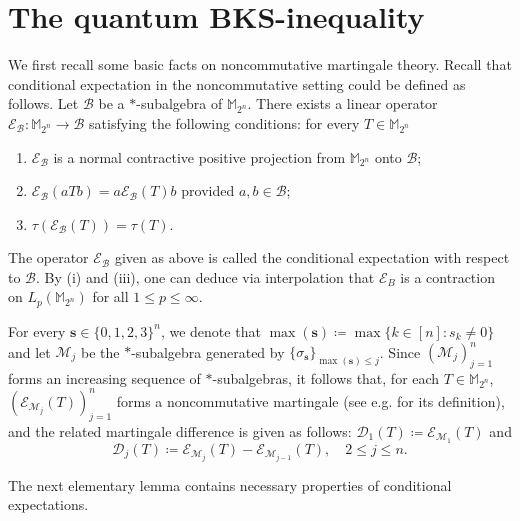 \documentclass{amsbook}
\theoremstyle{definition}
\theoremstyle{remark}
\numberwithin{section}{chapter}
\numberwithin{equation}{chapter}
\newcommand{\M}{\mathbb{M}}
\newcommand{\1}{\mathbf{1}}
\begin{document}
\section{The quantum BKS-inequality}\label{sec BKS 1}
We first recall some basic facts on noncommutative martingale theory. Recall that conditional expectation in the noncommutative setting could be defined as follows. Let $\mathcal{B}$ be a $\ast$-subalgebra of $\M_{2^{n}}$. There exists a linear operator $\mathcal{E}_{\mathcal{B}}: \M_{2^{n}}\to \mathcal{B}$ satisfying the following conditions: for every $T\in \M_{2^{n}}$
\begin{enumerate}[{\rm (i)}]
	\item $\mathcal{E}_{\mathcal{B}}$ is a normal contractive positive projection from $\M_{2^{n}}$ onto $\mathcal{B}$;
	\item $\mathcal{E}_{\mathcal{B}}(aTb)=a\mathcal{E}_{\mathcal{B}}(T)b$ provided $a,b\in\mathcal{B}$;
	\item $\tau(\mathcal{E}_{\mathcal{B}}(T))=\tau(T)$.
\end{enumerate}
The operator $\mathcal{E}_{\mathcal{B}}$ given as above is called the conditional expectation with respect to $\mathcal{B}$.  By (i) and (iii), one can deduce via interpolation that $\mathcal{E}_{B}$ is a contraction on $L_{p}(\M_{2^{n}})$ for all $1\leq p\leq\infty$.

For every $\mathbf{s}\in\{0,1,2,3\}^{n}$, we denote that $\max(\mathbf{s})\coloneqq\max\{k\in[n]:s_{k}\neq 0\}$ and let $\mathcal{M}_{j}$ be the $\ast$-subalgebra generated by $\{\sigma_{\mathbf{s}}\}_{\max(\mathbf{s})\leq j}$. Since $(\mathcal{M}_{j})_{j=1}^n$ forms an increasing sequence of $*$-subalgebras, it follows that, for each $T\in \M_{2^{n}}$, $(\mathcal{E}_{\mathcal{M}_{j}}(T))_{j=1}^{n}$ forms a noncommutative martingale (see e.g. \cite{PX1997} for its definition), and the related martingale difference is given as follows: $\mathcal{D}_{1}(T)\coloneqq\mathcal{E}_{\mathcal{M}_{1}}(T)$ and
\[
\mathcal{D}_{j}(T)\coloneqq\mathcal{E}_{\mathcal{M}_{j}}(T)-\mathcal{E}_{\mathcal{M}_{j-1}}(T),\quad 2\leq j\leq n.
\]


The next elementary lemma contains necessary properties of conditional expectations.
\end{document}
